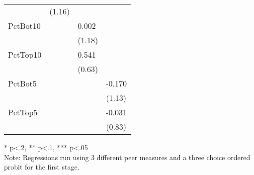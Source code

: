 \begin{table}[htb]
\begin{threeparttable}
\begin{tabular}{l l l l}
               & (1.16)                        &                               &                              \\
      PctBot10 &                               & 0.002                         &                              \\
               &                               & (1.18)                        &                              \\
      PctTop10 &                               & 0.541                         &                              \\
               &                               & (0.63)                        &                              \\
      PctBot5  &                               &                               & -0.170                       \\
               &                               &                               & (1.13)                       \\
      PctTop5  &                               &                               & -0.031                       \\
               &                               &                               & (0.83)                       \\
      \hline
      \hline
    \end{tabular}
    \begin{tablenotes}
    \item{* p<.2, ** p<.1, *** p<.05 \\Note: Regressions run using 3 different peer measures and a three choice ordered probit for the first stage.}
    \end{tablenotes}
    \centering
  \end{threeparttable}
\end{table}

\clearpage{}

